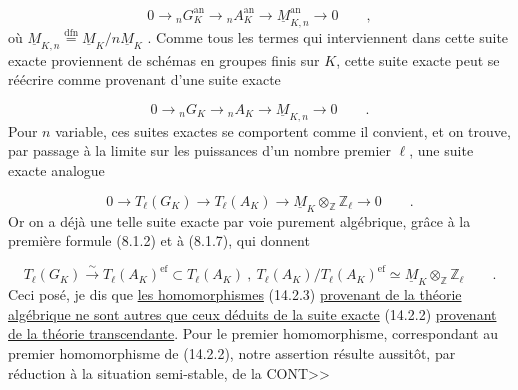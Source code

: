 \begin{equation*}
0 \longrightarrow {}_nG_K^{\mathrm{an}} \longrightarrow {}_nA_K^{\mathrm{an}} \longrightarrow \underline{M}_{K,n}^{\mathrm{an}} \longrightarrow 0 \qquad ,
\end{equation*}
où $\underline{M}_{K,n} \overset{\mathrm{dfn}}{=} \underline{M}_K/n\underline{M}_K$ . Comme tous les termes qui interviennent dans cette suite exacte proviennent de schémas en groupes finis sur $K$, cette suite exacte peut se réécrire comme provenant d'une suite exacte

\begin{equation}\tag{14.2.1}
0 \longrightarrow {}_nG_K \longrightarrow {}_nA_K \longrightarrow \underline{M}_{K,n} \longrightarrow 0 \qquad .
\end{equation}
Pour $n$ variable, ces suites exactes se comportent comme il convient, et on trouve, par passage à la limite sur les puissances d'un nombre premier $\ell$, une suite exacte analogue

\begin{equation}\tag{14.2.2}
0 \longrightarrow T_\ell(G_K) \longrightarrow T_\ell(A_K) \longrightarrow \underline{M}_K \otimes_{\mathbb{Z}} \mathbb{Z}_\ell \longrightarrow 0 \qquad .
\end{equation}
Or on a déjà une telle suite exacte par voie purement algébrique, grâce à la première formule (8.1.2) et à (8.1.7), qui donnent

\begin{equation}\tag{14.2.3}
T_\ell(G_K) \overset{\sim}{\longrightarrow} T_\ell(A_K)^{\mathrm{ef}} \subset T_\ell(A_K) \ , \ T_\ell(A_K)/T_\ell(A_K)^{\mathrm{ef}} \simeq \underline{M}_K \otimes_{\mathbb{Z}} \mathbb{Z}_\ell \qquad .
\end{equation}
Ceci posé, je dis que \underline{les homomorphismes} (14.2.3) \underline{provenant de la théorie algébrique ne sont autres que ceux déduits de la suite exacte} (14.2.2) \underline{provenant de la théorie transcendante}. Pour le premier homomorphisme, correspondant au premier homomorphisme de (14.2.2), notre assertion résulte aussitôt, par réduction à la situation semi-stable, de la CONT>>



